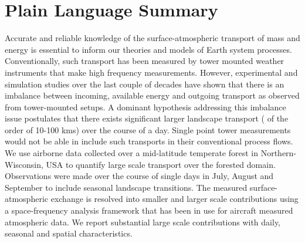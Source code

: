 \documentclass[draft]{agujournal2019}
\begin{document}
\section*{Plain Language Summary}
Accurate and reliable knowledge of the surface-atmospheric transport of mass and energy is essential to inform our theories and models of Earth system processes. Conventionally, such transport has been measured by tower mounted weather instruments that make high frequency measurements. However, experimental and simulation studies over the last couple of decades have shown that there is an imbalance between incoming, available energy and outgoing transport as observed from tower-mounted setups. A dominant hypothesis addressing this imbalance issue postulates that there exists significant larger landscape transport ( of the order of 10-100 kms) over the course of a day. Single point tower measurements would not be able in include such transports in their conventional process flows. We use airborne data collected over a mid-latitude temperate forest in Northern-Wisconsin, USA to quantify large scale transport over the forested domain. Observations were made over the course of single days in July, August and September to include seasonal landscape transitions. The measured surface-atmospheric exchange is resolved into smaller and larger scale contributions using a space-frequency analysis framework that has been in use for aircraft measured atmospheric data.  We report substantial large scale contributions with daily, seasonal and spatial characteristics.


%
%

%

\end{document}
